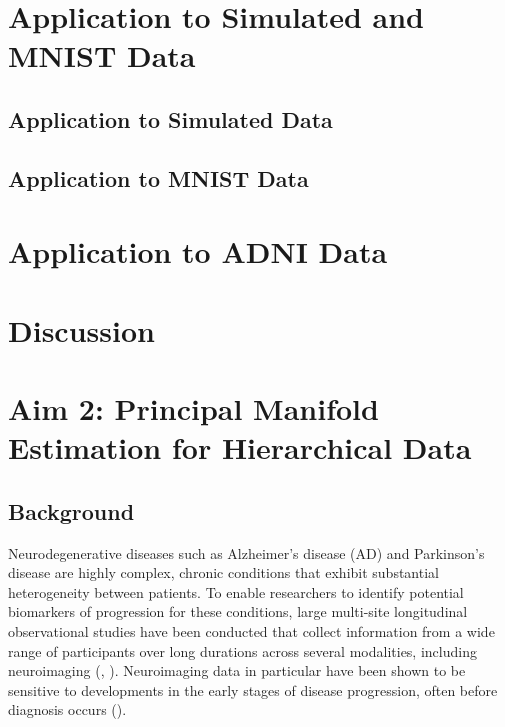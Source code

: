 \documentclass[11pt,reqno]{article}
\theoremstyle{definition}
\begin{document}
\section{Application to Simulated and MNIST Data}

\subsection{Application to Simulated Data}

\subsection{Application to MNIST Data}

\section{Application to ADNI Data}

\section{Discussion}

\section{Aim 2: Principal Manifold Estimation for Hierarchical Data} \label{sec:hpme}

\subsection{Background}

Neurodegenerative diseases such as Alzheimer's disease (AD) and Parkinson's disease are highly complex, chronic conditions that exhibit substantial heterogeneity between patients. To enable researchers to identify potential biomarkers of progression for these conditions, large multi-site longitudinal observational studies have been conducted that collect information from a wide range of participants over long durations across several modalities, including neuroimaging (\cite{muellerWaysEarlyDiagnosis2005}, \cite{marekParkinsonProgressionMarker2011}). Neuroimaging data in particular have been shown to be sensitive to developments in the early stages of disease progression, often before diagnosis occurs (\cite{jackHypotheticalModelDynamic2010}).
\end{document}
